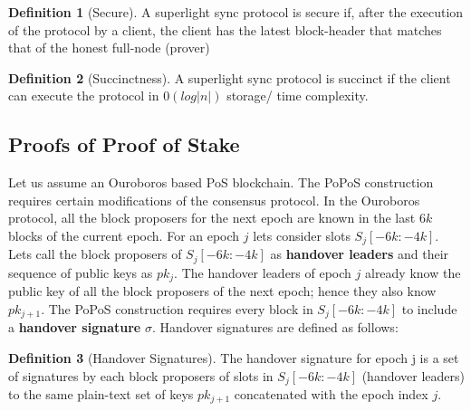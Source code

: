 \documentclass[a4paper,11pt,oneside]{article}
\theoremstyle{definition}
\newtheorem{definition}{Definition}
\begin{document}
    \begin{definition}[Secure]
    A superlight sync protocol is secure if, after the execution of the protocol by a client, the client has the latest block-header that matches that of the honest full-node (prover)
    \end{definition}
    
    \begin{definition}[Succinctness]
    A superlight sync protocol is succinct if the client can execute the protocol in $0(log |n|)$ storage/ time complexity. 
    \end{definition}
  
  
    \subsection{Proofs of Proof of Stake}
    Let us assume an Ouroboros based PoS blockchain. The PoPoS construction requires certain modifications of the consensus protocol. In the Ouroboros protocol, all the block proposers for the next epoch are known in the last $6k$ blocks of the current epoch. For an epoch $j$ lets consider slots $S_j[-6k: -4k]$. Lets call the block proposers of $S_j[-6k:-4k]$ as \textbf{handover leaders} and their sequence of public keys as $pk_{j}$. The handover leaders of epoch $j$ already know the public key of all the block proposers of the next epoch; hence they also know $pk_{j + 1}$. The PoPoS construction requires every block in $S_j[-6k:-4k]$ to include a \textbf{handover signature} $\sigma$. Handover signatures are defined as follows:
  
    \begin{definition}[Handover Signatures]
    The handover signature for epoch j is a set of signatures by each block proposers of slots in $S_j[-6k:-4k]$ (handover leaders) to the same plain-text set of keys $pk_{j+1}$ concatenated with the epoch index $j$.
    \end{definition}
   
\end{document}
